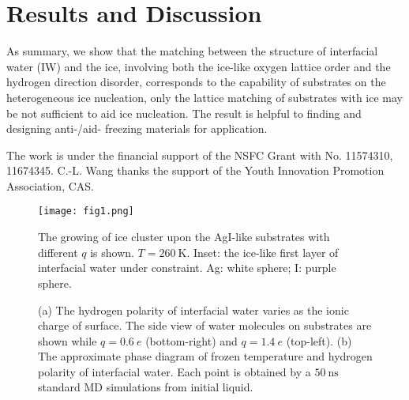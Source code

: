 \documentclass[aps,prl,twocolumn,superscriptaddress]{revtex4-1}
\begin{document}
\section{Results and Discussion} 

As summary, we show that the matching between the structure of interfacial water (IW) and the ice, involving both the ice-like oxygen lattice order and the hydrogen direction disorder, corresponds to the capability of substrates on the heterogeneous ice nucleation, only the lattice matching of substrates with ice may be not sufficient to aid ice nucleation. The result is helpful to finding and designing anti-/aid- freezing materials for application. 
    
The work is under the financial support of the NSFC Grant with No. 11574310, 11674345. C.-L. Wang thanks the support of the Youth Innovation Promotion Association, CAS. 


\begin{figure}[ht]
\centering{}\texttt{[image: fig1.png]} 
\caption{The growing of ice cluster upon the AgI-like substrates with different $q$ is shown. $T=260~\mathrm{K}$.
Inset: the ice-like first layer of interfacial water under constraint. Ag: white sphere; I: purple sphere. 
\label{fig:fig1} }
\end{figure}

\begin{figure}[ht]
  \centering
\caption{ (a) The hydrogen polarity of interfacial water varies as the ionic charge of surface. The side view of water molecules on substrates are shown while $q =0.6~ e$ (bottom-right) and $q= 1.4~e $ (top-left). (b) The approximate  phase diagram of frozen temperature and hydrogen polarity of interfacial water. Each point is obtained by a $50~ \mathrm{ns}$ standard MD simulations from initial liquid.
 }
\label{fig:fig2} 
\end{figure}
\end{document}
